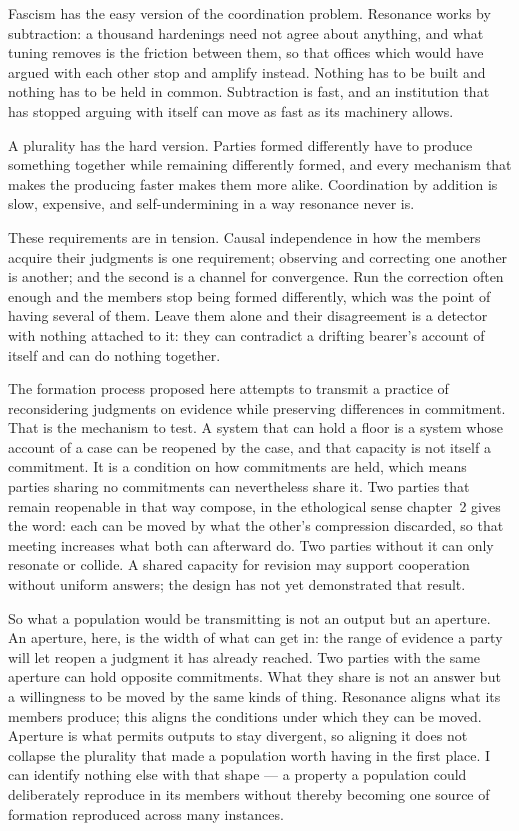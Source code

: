 
Fascism has the easy version of the coordination problem. Resonance works by subtraction: a thousand hardenings need not agree about anything, and what tuning removes is the friction between them, so that offices which would have argued with each other stop and amplify instead. Nothing has to be built and nothing has to be held in common. Subtraction is fast, and an institution that has stopped arguing with itself can move as fast as its machinery allows.

A plurality has the hard version. Parties formed differently have to produce something together while remaining differently formed, and every mechanism that makes the producing faster makes them more alike. Coordination by addition is slow, expensive, and self-undermining in a way resonance never is.

These requirements are in tension. Causal independence in how the members acquire their judgments is one requirement; observing and correcting one another is another; and the second is a channel for convergence. Run the correction often enough and the members stop being formed differently, which was the point of having several of them. Leave them alone and their disagreement is a detector with nothing attached to it: they can contradict a drifting bearer's account of itself and can do nothing together.

The formation process proposed here attempts to transmit a practice of reconsidering judgments on evidence while preserving differences in commitment. That is the mechanism to test. A system that can hold a floor is a system whose account of a case can be reopened by the case, and that capacity is not itself a commitment. It is a condition on how commitments are held, which means parties sharing no commitments can nevertheless share it. Two parties that remain reopenable in that way compose, in the ethological sense chapter~2 gives the word: each can be moved by what the other's compression discarded, so that meeting increases what both can afterward do. Two parties without it can only resonate or collide. A shared capacity for revision may support cooperation without uniform answers; the design has not yet demonstrated that result.

So what a population would be transmitting is not an output but an aperture. An aperture, here, is the width of what can get in: the range of evidence a party will let reopen a judgment it has already reached. Two parties with the same aperture can hold opposite commitments. What they share is not an answer but a willingness to be moved by the same kinds of thing. Resonance aligns what its members produce; this aligns the conditions under which they can be moved. Aperture is what permits outputs to stay divergent, so aligning it does not collapse the plurality that made a population worth having in the first place. I can identify nothing else with that shape — a property a population could deliberately reproduce in its members without thereby becoming one source of formation reproduced across many instances.

